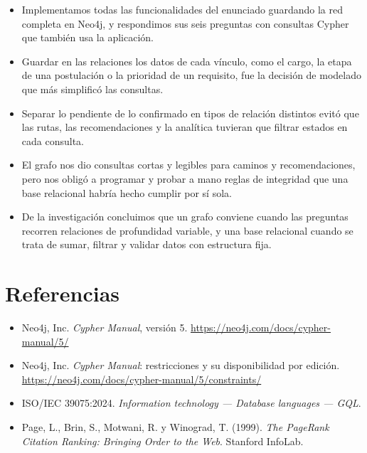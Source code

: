 \documentclass[11pt, a4paper]{article}
\begin{document}
\begin{itemize}[label=\textcolor{azul}{\rule{0.5em}{0.5em}}, leftmargin=1.4em, itemsep=0.5em]
  \item Implementamos todas las funcionalidades del enunciado guardando la red completa
        en Neo4j, y respondimos sus seis preguntas con consultas Cypher que también usa
        la aplicación.
  \item Guardar en las relaciones los datos de cada vínculo, como el cargo, la etapa de
        una postulación o la prioridad de un requisito, fue la decisión de modelado que
        más simplificó las consultas.
  \item Separar lo pendiente de lo confirmado en tipos de relación distintos evitó que
        las rutas, las recomendaciones y la analítica tuvieran que filtrar estados en
        cada consulta.
  \item El grafo nos dio consultas cortas y legibles para caminos y recomendaciones,
        pero nos obligó a programar y probar a mano reglas de integridad que una base
        relacional habría hecho cumplir por sí sola.
  \item De la investigación concluimos que un grafo conviene cuando las
        preguntas recorren relaciones de profundidad variable, y una base relacional
        cuando se trata de sumar, filtrar y validar datos con estructura fija.
\end{itemize}

\section{Referencias}

\begin{itemize}[label=\textcolor{azul}{\rule{0.5em}{0.5em}}, leftmargin=1.4em, itemsep=0.4em]
  \item Neo4j, Inc. \emph{Cypher Manual}, versión 5. \url{https://neo4j.com/docs/cypher-manual/5/}
  \item Neo4j, Inc. \emph{Cypher Manual}: restricciones y su disponibilidad por edición. \url{https://neo4j.com/docs/cypher-manual/5/constraints/}
  \item ISO/IEC 39075:2024. \emph{Information technology --- Database languages --- GQL}.
  \item Page, L., Brin, S., Motwani, R. y Winograd, T. (1999). \emph{The PageRank Citation Ranking: Bringing Order to the Web}. Stanford InfoLab.
\end{itemize}
\end{document}
